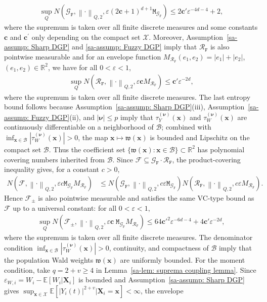 \documentclass[10pt]{article}
\newcommand{\E}{\mathbb{E}}
\newcommand{\reals}{\mathbb{R}}
\newcommand{\norm}[1]{\left\lVert#1\right\rVert}
\newcommand{\bc}{\mathbf{c}}
\newcommand{\bx}{\mathbf{x}}
\newcommand{\bX}{\mathbf{X}}
\newcommand{\bnu}{\boldsymbol{\nu}}
\newcommand{\B}{\mathcal{B}}
\newcommand{\F}{\mathcal{F}}
\newcommand{\G}{\mathcal{G}}
\newcommand{\R}{\mathcal{R}}
\newcommand{\X}{\mathcal{X}}
\newcommand{\ttF}{\mathtt{F}}
\newcommand{\ttM}{\mathtt{M}}
\begin{document}
\begin{align*}
    \sup_{Q} N(\G_{\ttF}, \norm{\cdot}_{Q,2}, \varepsilon (2 \bc +1)^{d+1} \ttM_{\G_{\ttF}}) \leq 2 \bc' \varepsilon^{-4d-4} + 2,
\end{align*}
where the supremum is taken over all finite discrete measures and some constants $\bc$ and $\bc^{\prime}$ only depending on the compact set $\X$. Moreover, Assumption~\ref{sa-assump: Sharp DGP} and \ref{sa-assump: Fuzzy DGP} imply that $\R_{\ttF}$ is also pointwise measurable and for an envelope function $M_{\R_{\ttF}}(e_1, e_2) = |e_1| + |e_2|$, $(e_1, e_2) \in \reals^2$, we have for all $0 < \varepsilon < 1$,
\begin{align*}
    \sup_{Q} N(\R_{\ttF}, \norm{\cdot}_{Q,2}, \varepsilon \bc M_{\R_{\ttF}}) \leq \bc' \varepsilon^{-2d},
\end{align*}
where the supremum is taken over all finite discrete measures. The last entropy bound follows because Assumption~\ref{sa-assump: Sharp DGP}(iii), Assumption~\ref{sa-assump: Fuzzy DGP}(ii), and $|\bnu|\leq p$ imply that $\tau_Y^{(\bnu)}(\bx)$ and $\tau_W^{(\bnu)}(\bx)$ are continuously differentiable on a neighborhood of $\B$; combined with $\inf_{\bx\in\B}|\tau_W^{(\bnu)}(\bx)|>0$, the map $\bx\mapsto\mathfrak w(\bx)$ is bounded and Lipschitz on the compact set $\B$. Thus the coefficient set $\{\mathfrak w(\bx):\bx\in\B\}\subset\reals^2$ has polynomial covering numbers inherited from $\B$. Since $\F\subseteq \G_{\ttF}\cdot\R_{\ttF}$, the product-covering inequality gives, for a constant $c>0$,
\begin{align*}
    N(\F, \norm{\cdot}_{Q,2}, \varepsilon c \ttM_{\G_{\ttF}}M_{\R_{\ttF}})
    &\leq
    N(\G_{\ttF}, \norm{\cdot}_{Q,2}, c\varepsilon\ttM_{\G_{\ttF}})
    N(\R_{\ttF}, \norm{\cdot}_{Q,2}, c\varepsilon M_{\R_{\ttF}}).
\end{align*}
Hence $\F_{\pm}$ is also pointwise measurable and satisfies the same VC-type bound as $\F$ up to a universal constant: for all $0 < \varepsilon < 1$,
\begin{align*}
    \sup_{Q} N(\F_{\pm}, \norm{\cdot}_{Q,2}, \varepsilon \bc \; \ttM_{\G_{\ttF}} M_{\R_{\ttF}}) \leq 64 \bc'^2 \varepsilon^{-6d-4} + 4 \bc' \varepsilon^{-2d},
\end{align*}
where the supremum is taken over all finite discrete measures. The denominator condition $\inf_{\bx \in \B}|\tau_W^{(\bnu)}(\bx)|>0$, continuity, and compactness of $\B$ imply that the population Wald weights $\mathfrak{w}(\bx)$ are uniformly bounded. For the moment condition, take $q=2+v\geq4$ in Lemma~\ref{sa-lem: suprema coupling lemma}. Since $\varepsilon_{W,i}=W_i-\E[W_i|\bX_i]$ is bounded and Assumption~\ref{sa-assump: Sharp DGP} gives $\sup_{\bx \in \X}\E[|Y_i(t)|^{2+v}|\bX_i = \bx] < \infty$, the envelope
\end{document}
